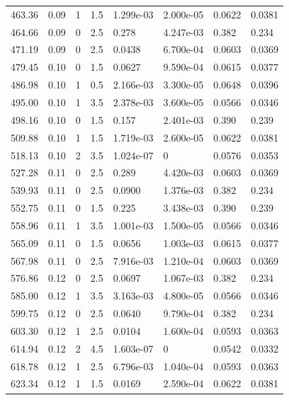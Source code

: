 \documentclass[preview]{standalone}
\begin{document}
{{{\begin{tabular}{L{1.2cm}C{1.2cm} C{0.3cm}C{0.5cm} C{1.4cm}C{1.4cm} C{1.4cm}C{1.4cm}}
  463.36  &  0.09  & 1     & 1.5 &  1.299e-03  & 2.000e-05  & 0.0622 &  0.0381   \\ 
  464.66  &  0.09  & 0     & 2.5 &  0.278  & 4.247e-03  & 0.382 &  0.234   \\ 
  471.19  &  0.09  & 0     & 2.5 &  0.0438  & 6.700e-04  & 0.0603 &  0.0369   \\ 
  479.45  &  0.10  & 0     & 1.5 &  0.0627  & 9.590e-04  & 0.0615 &  0.0377   \\ 
  486.98  &  0.10  & 1     & 0.5 &  2.166e-03  & 3.300e-05  & 0.0648 &  0.0396   \\ 
  495.00  &  0.10  & 1     & 3.5 &  2.378e-03  & 3.600e-05  & 0.0566 &  0.0346   \\ 
  498.16  &  0.10  & 0     & 1.5 &  0.157  & 2.401e-03  & 0.390 &  0.239   \\ 
  509.88  &  0.10  & 1     & 1.5 &  1.719e-03  & 2.600e-05  & 0.0622 &  0.0381   \\ 
  518.13  &  0.10  & 2     & 3.5 &  1.024e-07  & 0  & 0.0576 &  0.0353   \\ 
  527.28  &  0.11  & 0     & 2.5 &  0.289  & 4.420e-03  & 0.0603 &  0.0369   \\ 
  539.93  &  0.11  & 0     & 2.5 &  0.0900  & 1.376e-03  & 0.382 &  0.234   \\ 
  552.75  &  0.11  & 0     & 1.5 &  0.225  & 3.438e-03  & 0.390 &  0.239   \\ 
  558.96  &  0.11  & 1     & 3.5 &  1.001e-03  & 1.500e-05  & 0.0566 &  0.0346   \\ 
  565.09  &  0.11  & 0     & 1.5 &  0.0656  & 1.003e-03  & 0.0615 &  0.0377   \\ 
  567.98  &  0.11  & 0     & 2.5 &  7.916e-03  & 1.210e-04  & 0.0603 &  0.0369   \\ 
  576.86  &  0.12  & 0     & 2.5 &  0.0697  & 1.067e-03  & 0.382 &  0.234   \\ 
  585.00  &  0.12  & 1     & 3.5 &  3.163e-03  & 4.800e-05  & 0.0566 &  0.0346   \\ 
  599.75  &  0.12  & 0     & 2.5 &  0.0640  & 9.790e-04  & 0.382 &  0.234   \\ 
  603.30  &  0.12  & 1     & 2.5 &  0.0104  & 1.600e-04  & 0.0593 &  0.0363   \\ 
  614.94  &  0.12  & 2     & 4.5 &  1.603e-07  & 0  & 0.0542 &  0.0332   \\ 
  618.78  &  0.12  & 1     & 2.5 &  6.796e-03  & 1.040e-04  & 0.0593 &  0.0363   \\ 
  623.34  &  0.12  & 1     & 1.5 &  0.0169  & 2.590e-04  & 0.0622 &  0.0381   \\ 

\end{tabular}}}}
\end{document}
